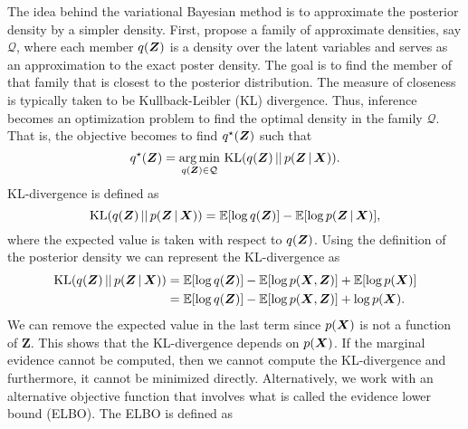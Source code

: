  The idea behind the variational Bayesian method is to approximate the posterior density by a simpler density. First, propose a family of approximate densities, say $\mathcal Q$, where each member $q \mleft( {\bm Z} \mright)$ is a density over the latent variables and serves as an approximation to the exact poster density. The goal is to find the member of that family that is closest to the posterior distribution. The measure of closeness is typically taken to be Kullback-Leibler (KL) divergence. Thus, inference becomes an optimization problem to find the optimal density in the family $\mathcal{Q}$. That is, the objective becomes to find $q^{\star} \mleft( {\bm Z} \mright)$ such that
\begin{equation}
	q^{\star} \mleft( {\bm Z} \mright) = 
	\underset{q \mleft( {\bm Z} \mright) \in \mathcal{Q}}{\arg \min} \text{ KL} \mleft( q \mleft( {\bm Z} \mright) \, \vert \vert \, p \mleft( {\bm Z} \, \vert \, {\bm X} \mright) \mright).
\end{equation} 
KL-divergence is defined as
\begin{equation}
	\text{KL} \mleft( q \mleft( {\bm Z} \mright) \, \vert \vert \, p \mleft( {\bm Z} \, \vert \, {\bm X} \mright) \mright) = 
	\mathbb{E} \mleft[ \log q({\bm Z}) \mright] - \mathbb{E} \mleft[ \log p \mleft( {\bm Z} \, \vert \, {\bm X} \mright) \mright],
\end{equation}
where the expected value is taken with respect to $q \mleft( {\bm Z} \mright)$. Using the definition of the posterior density we can represent the KL-divergence as
\begin{align}
	\text{KL} \mleft( q \mleft( {\bm Z} \mright) \, \vert \vert \, p \mleft( {\bm Z} \, \vert \, {\bm X} \mright) \mright) &= 
	\mathbb{E} \mleft[ \log q({\bm Z}) \mright] - \mathbb{E} \mleft[ \log p \mleft( {\bm X}, {\bm Z} \mright) \mright] + \mathbb{E} \mleft[ \log p \mleft( {\bm X} \mright) \mright] \\
	&= \mathbb{E} \mleft[ \log q({\bm Z}) \mright] - \mathbb{E} \mleft[ \log p \mleft( {\bm X}, {\bm Z} \mright) \mright] + \log p \mleft( {\bm X} \mright).
\end{align}
We can remove the expected value in the last term since $p \mleft( {\bm X} \mright)$ is not a function of ${\bm Z}$. This shows that the KL-divergence depends on $p \mleft( {\bm X} \mright)$. If the marginal evidence cannot be computed, then we cannot compute the KL-divergence and furthermore, it cannot be minimized directly. Alternatively, we work with an alternative objective function that involves what is called the evidence lower bound (ELBO). The ELBO is defined as
